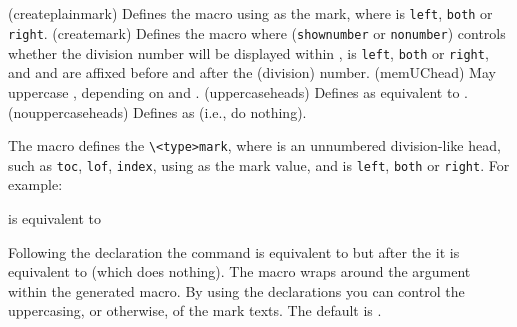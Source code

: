 \begin{syntax}
\cmd{\createplainmark} \\
\cmd{\memUChead} \\
\cmd{\uppercaseheads} \cmd{\nouppercaseheads} \\
\cmd{\createmark} \\
\end{syntax}
\glossary(createplainmark)%
  {}%
  {Defines the  macro using  as the mark, where
   is \texttt{left}, \texttt{both} or \texttt{right}.}
\glossary(createmark)%
  {}%
  {Defines the  macro where  (\texttt{shownumber} 
   or \texttt{nonumber}) controls whether the division number will be
   displayed within ,  is \texttt{left}, 
   \texttt{both} or \texttt{right}, and  and 
   are affixed before and after the  (division) number.}
\glossary(memUChead)%
  {}%
  {May uppercase , depending on  and
  .}
\glossary(uppercaseheads)%
  {}%
  {Defines  as equivalent to .}
\glossary(nouppercaseheads)%
  {}%
  {Defines  as  (i.e., do nothing).}


The macro \cmd{\createplainmark} defines the \verb?\<type>mark?, where 
 is an unnumbered division-like head, such as \texttt{toc},
\texttt{lof}, \texttt{index}, using  as the mark value, and 
 is \texttt{left}, \texttt{both} or \texttt{right}. For example:
\begin{lcode}
\end{lcode}
is equivalent to
\begin{lcode}
\def\tocmark{\markboth{\memUChead{\contentsname}}{}}
\def\lotmark{\markright{\memUChead{\listtablename}}}
\def\lofmark{\markboth{\memUChead{\bibname}}{\memUChead{\bibname}}}
\end{lcode}

    Following the declaration \cmd{\uppercaseheads} the \cmd{\memUChead} 
command is equivalent to \cmd{\MakeUppercase} but after the 
\cmd{\nouppercaseheads} it is equivalent to \cmd{\relax} (which does nothing).
The \cmd{\createplainmark} macro wraps \cmd{\memUChead} around the 
argument within the generated  macro. By using the
 declarations you can control the uppercasing, or
otherwise, of the mark texts. The default is \cmd{\uppercaseheads}.

